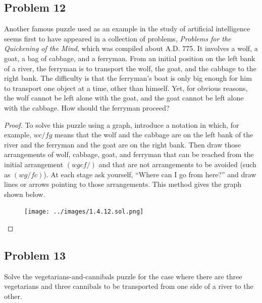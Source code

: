 \documentclass[14pt]{extarticle}
\begin{document}
\subsection{Problem 12}
Another famous puzzle used as an example in the study of artificial
intelligence seems first to have appeared in a collection of problems, {\it
        Problems for the Quickening of the Mind}, which was compiled about A.D. 775. It
involves a wolf, a goat, a bag of cabbage, and a ferryman. From an initial
position on the left bank of a river, the ferryman is to transport the wolf,
the goat, and the cabbage to the right bank. The difficulty is that the
ferryman’s boat is only big enough for him to transport one object at a time,
other than himself. Yet, for obvious reasons, the wolf cannot be left alone with
the goat, and the goat cannot be left alone with the cabbage. How should the
ferryman proceed?

\begin{proof}
    To solve this puzzle using a graph, introduce a notation in which, for example,
    $wc / fg$ means that the wolf and the cabbage are on the left bank of the river
    and the ferryman and the goat are on the right bank. Then draw those
    arrangements of wolf, cabbage, goat, and ferryman that can be reached from the
    initial arrangement $(wgcf /)$ and that are not arrangements to be avoided
    (such as $(wg / fc)$). At each stage ask yourself, “Where can I go from here?”
    and draw lines or arrows pointing to those arrangements. This method gives the
    graph shown below.

    \begin{figure}[ht!]
        \centering
        \texttt{[image: ../images/1.4.12.sol.png]}
    \end{figure}
\end{proof}

\subsection{Problem 13}
Solve the vegetarians-and-cannibals puzzle for the case where there are three
vegetarians and three cannibals to be transported from one side of a river to
the other.
\end{document}
